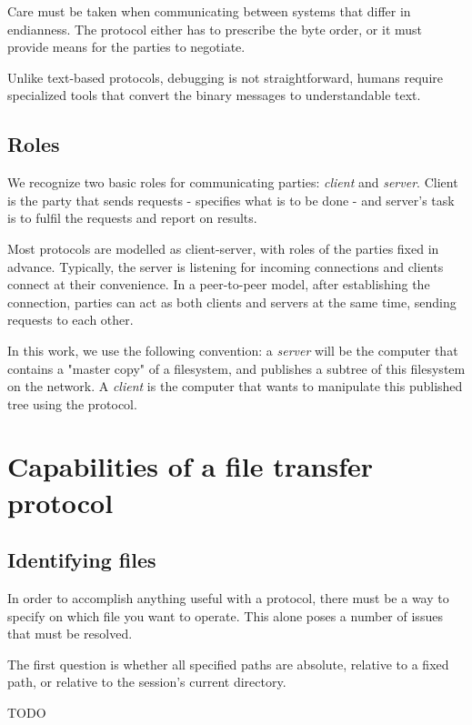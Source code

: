 Care must be taken when communicating between systems that differ in endianness.  The protocol either has to
prescribe the byte order, or it must provide means for the parties to negotiate.

Unlike text-based protocols, debugging is not straightforward, humans require specialized tools that convert
the binary messages to understandable text.


\subsection{Roles}

We recognize two basic roles for communicating parties: {\it client} and {\it server}. Client is the party
that sends requests - specifies what is to be done - and server's task is to fulfil the requests and report on
results.

Most protocols are modelled as client-server, with roles of the parties fixed in advance. Typically, the
server is listening for incoming connections and clients connect at their convenience. In a peer-to-peer
model, after establishing the connection, parties can act as both clients and servers at the same time,
sending requests to each other.

In this work, we use the following convention: a {\it server} will be the computer that contains a "master
copy" of a filesystem, and publishes a subtree of this filesystem on the network. A {\it client} is the
computer that wants to manipulate this published tree using the protocol.



\section{Capabilities of a file transfer protocol}

\subsection{Identifying files}

In order to accomplish anything useful with a protocol, there must be a way to specify on which file you want
to operate. This alone poses a number of issues that must be resolved.

The first question is whether all specified paths are absolute, relative to a fixed path, or relative to the
session's current directory.

TODO

